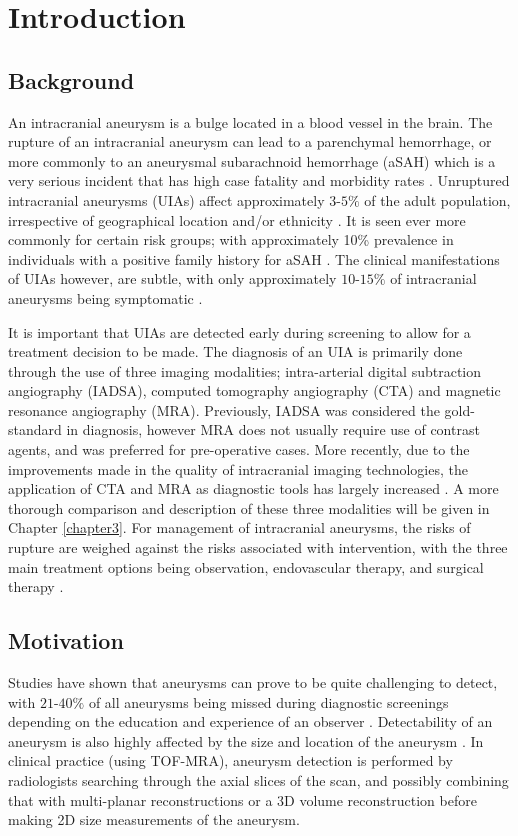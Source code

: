 \chapter{Introduction}
\label{chapter1}

\section{Background}
An intracranial aneurysm is a bulge located in a blood vessel in the brain. The rupture of an intracranial aneurysm can lead to a parenchymal hemorrhage, or more commonly to an aneurysmal subarachnoid hemorrhage (aSAH) which is a very serious incident that has high case fatality and morbidity rates \cite{Keedy2006}. Unruptured intracranial aneurysms (UIAs) affect approximately $3$-$5 \%$ of the adult population, irrespective of geographical location and/or ethnicity \cite{vlak2011prevalence}. It is seen ever more commonly for certain risk groups; with approximately 10\% prevalence in individuals with a positive family history for aSAH \cite{bor2014long}. The clinical manifestations of UIAs however, are subtle, with only approximately $10$-$15\%$ of intracranial aneurysms being symptomatic \cite{friedman2001small}. 

It is important that UIAs are detected early during screening to allow for a treatment decision to be made. The diagnosis of an UIA is primarily done through the use of three imaging modalities; intra-arterial digital subtraction angiography (IADSA), computed tomography angiography (CTA) and magnetic resonance angiography (MRA). Previously, IADSA was considered the gold-standard in diagnosis, however MRA does not usually require use of contrast agents, and was preferred for pre-operative cases. More recently, due to the improvements made in the quality of intracranial imaging technologies, the application of CTA and MRA as diagnostic tools has largely increased \cite{Brown2014}. A more thorough comparison and description of these three modalities will be given in Chapter \ref{chapter3}. For management of intracranial aneurysms, the risks of rupture are weighed against the risks associated with intervention, with the three main treatment options being observation, endovascular therapy, and surgical therapy \cite{Keedy2006}. 

\section{Motivation}
Studies have shown that aneurysms can prove to be quite challenging to detect, with $21$-$40\%$ of all aneurysms being missed during diagnostic screenings depending on the education and experience of an observer . Detectability of an aneurysm is also highly affected by the size and location of the aneurysm \cite{okahara2002diagnostic}. In clinical practice (using TOF-MRA), aneurysm detection is performed by radiologists searching through the axial slices of the scan, and possibly combining that with multi-planar reconstructions or a 3D volume reconstruction before making 2D size measurements of the aneurysm. 

